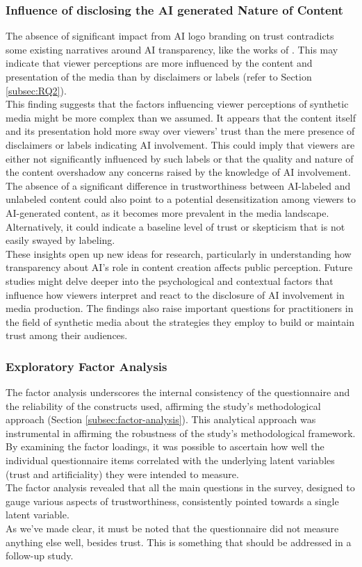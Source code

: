 \documentclass[
  a4paper,  %
  twoside,  %
  bibliography=totoc,
  headsepline,
  cleardoublepage=empty,
  parskip=half,
  draft=false
]{scrbook}
\begin{document}
\subsubsection{Influence of disclosing the AI generated Nature of Content}
The absence of significant impact from AI logo branding on trust contradicts some existing narratives around AI transparency, like the works of . This may indicate that viewer perceptions are more influenced by the content and presentation of the media than by disclaimers or labels (refer to Section \ref{subsec:RQ2}). \\
This finding suggests that the factors influencing viewer perceptions of synthetic media might be more complex than we assumed. It appears that the content itself and its presentation hold more sway over viewers' trust than the mere presence of disclaimers or labels indicating AI involvement. This could imply that viewers are either not significantly influenced by such labels or that the quality and nature of the content overshadow any concerns raised by the knowledge of AI involvement. \\
The absence of a significant difference in trustworthiness between AI-labeled and unlabeled content could also point to a potential desensitization among viewers to AI-generated content, as it becomes more prevalent in the media landscape. Alternatively, it could indicate a baseline level of trust or skepticism that is not easily swayed by labeling. \\
These insights open up new ideas for research, particularly in understanding how transparency about AI's role in content creation affects public perception. Future studies might delve deeper into the psychological and contextual factors that influence how viewers interpret and react to the disclosure of AI involvement in media production. The findings also raise important questions for practitioners in the field of synthetic media about the strategies they employ to build or maintain trust among their audiences.


\subsubsection{Exploratory Factor Analysis}
The factor analysis underscores the internal consistency of the questionnaire and the reliability of the constructs used, affirming the study's methodological approach (Section \ref{subsec:factor-analysis}). This analytical approach was instrumental in affirming the robustness of the study's methodological framework. By examining the factor loadings, it was possible to ascertain how well the individual questionnaire items correlated with the underlying latent variables (trust and artificiality) they were intended to measure. \\
The factor analysis revealed that all the main questions in the survey, designed to gauge various aspects of trustworthiness, consistently pointed towards a single latent variable. \\
As we've made clear, it must be noted that the questionnaire did not measure anything else well, besides trust. This is something that should be addressed in a follow-up study.
\end{document}
